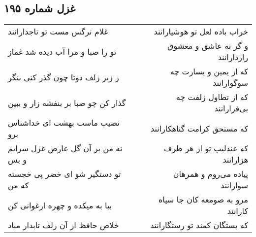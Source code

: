 \begin{center}
\section*{غزل شماره ۱۹۵}
\label{sec:sh195}
\begin{longtable}{l p{0.5cm} r}
غلام نرگس مست تو تاجدارانند
&&
خراب باده لعل تو هوشیارانند
\\
تو را صبا و مرا آب دیده شد غماز
&&
و گر نه عاشق و معشوق رازدارانند
\\
ز زیر زلف دوتا چون گذر کنی بنگر
&&
که از یمین و یسارت چه سوگوارانند
\\
گذار کن چو صبا بر بنفشه زار و ببین
&&
که از تطاول زلفت چه بی‌قرارانند
\\
نصیب ماست بهشت ای خداشناس برو
&&
که مستحق کرامت گناهکارانند
\\
نه من بر آن گل عارض غزل سرایم و بس
&&
که عندلیب تو از هر طرف هزارانند
\\
تو دستگیر شو ای خضر پی خجسته که من
&&
پیاده می‌روم و همرهان سوارانند
\\
بیا به میکده و چهره ارغوانی کن
&&
مرو به صومعه کان جا سیاه کارانند
\\
خلاص حافظ از آن زلف تابدار مباد
&&
که بستگان کمند تو رستگارانند
\\
\end{longtable}
\end{center}
